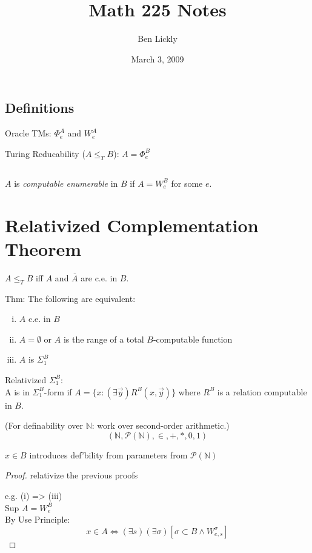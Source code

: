 \documentclass[12pt]{article}
\author{Ben Lickly}
\date{March 3, 2009}
\title{Math 225 Notes}
\newcommand{\Nat}{\ensuremath{\mathbb{N}}}
\newcommand{\Conj}[1]{\ensuremath{\overline{#1}}}
\newcommand{\Pow}[1]{\ensuremath{\mathcal{P}(#1)}}
\begin{document}
\maketitle

\subsection*{Definitions}
Oracle TMs:
$\Phi^A_e$ and $W^A_e$

Turing Reducability
($A \le_T B$):
$A = \Phi^B_e$

\subsection*{}
$A$ is \textit{computable enumerable} in $B$ if $A = W^B_e$ for some $e$.

\section*{Relativized Complementation Theorem}
 $A \le_T B$ iff $A$ and $\Conj{A}$ are c.e. in $B$.

Thm: The following are equivalent:
\begin{enumerate}[(i)]
\item $A$ c.e. in $B$
\item $A = \emptyset$ or $A$ is the range of a total $B$-computable function
\item $A$ is $\Sigma_1^B$
\end{enumerate}

Relativized $\Sigma_1^B$: \\
	A is in $\Sigma_1^B$-form if $A = \{ x : (\exists \vec{y}) R^B(x, \vec{y}) \}$
	where $R^B$ is a relation computable in $B$.

(For definability over $\Nat$: work over second-order arithmetic.)
\[ (\Nat, \Pow{\Nat},    \in, +, *, 0, 1) \]

 $x 	\in 	B$
introduces def'bility from parameters from $\Pow{\Nat}$

\begin{proof}
 relativize the previous proofs

e.g. (i) => (iii) \\
Sup $A = W^B_e$ \\
By Use Principle: 
\[
 x \in A \Leftrightarrow (\exists s) (\exists \sigma) [ \sigma \subset B \wedge W_{e,s}^\sigma]
\]
\end{proof}
\end{document}
